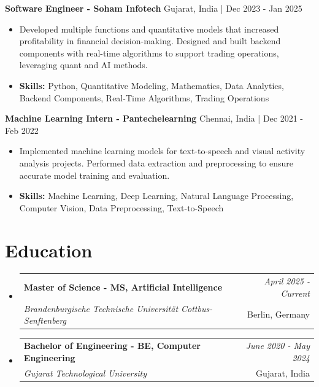 \documentclass[a4paper,11pt]{article}
\makeatletter
\newcommand{\resumeSubheading}[4]{
\vspace{0.5mm}\item
    \begin{tabular*}{0.98\textwidth}[t]{l@{\extracolsep{\fill}}r}
        \textbf{#1} & \textit{\footnotesize{#4}} \\
        \textit{\footnotesize{#3}} &  \footnotesize{#2}\\
    \end{tabular*}
    \vspace{-2.4mm}
}
\makeatother
\begin{document}
\vspace{1mm}
  \textbf{Software Engineer - Soham Infotech} \hfill Gujarat, India | Dec 2023 - Jan 2025
\vspace{-1.5mm} %
\begin{itemize}
  \item Developed multiple functions and quantitative models that increased profitability in financial decision-making. Designed and built backend components with real-time algorithms to support trading operations, leveraging quant and AI methods.

\vspace{-2mm}
  \item \textbf{Skills:} Python, Quantitative Modeling, Mathematics, Data Analytics, Backend Components, Real-Time Algorithms, Trading Operations
\end{itemize}

\vspace{1mm}
  \textbf{Machine Learning Intern - Pantechelearning} \hfill Chennai, India | Dec 2021 - Feb 2022
\vspace{-1.5mm} %
\begin{itemize}
  \item Implemented machine learning models for text-to-speech and visual activity analysis projects. Performed data extraction and preprocessing to ensure accurate model training and evaluation.
\vspace{-2mm}
  \item \textbf{Skills:} Machine Learning, Deep Learning, Natural Language Processing, Computer Vision, Data Preprocessing, Text-to-Speech
\end{itemize}\section{\textbf{Education}}
\vspace{-0.4mm}

\begin{itemize}
\resumeSubheading
{Master of Science - MS, Artificial Intelligence }{Berlin, Germany}
{Brandenburgische Technische Universität Cottbus-Senftenberg  }{April 2025 - Current}

\vspace{1.0mm} %
\resumeSubheading
{Bachelor of Engineering - BE, Computer Engineering  }{Gujarat, India}
{Gujarat Technological University }{June 2020 - May 2024}

\end{itemize}
\end{document}
